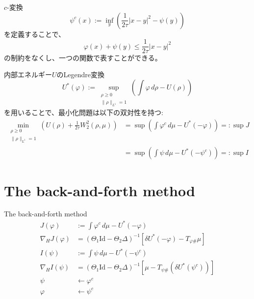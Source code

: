 \documentclass[dvipdfmx, 12pt]{beamer}
\begin{document}
\begin{frame}{}
    \(c\)-変換
    \[
        \psi^c(x) := \inf_{y} \left(\frac{1}{2\tau} |x-y|^2 - \psi(y)\right)
    \]
    を定義することで、
    \[
        \varphi(x) + \psi(y) \leq \frac{1}{2 \tau} |x - y|^2
    \]
    の制約をなくし、一つの関数で表すことができる。

    
\end{frame}


\begin{frame}{}

    内部エネルギー$U$のLegendre変換
    \[
      U^*(\varphi) := \sup_{{\substack{\rho \ge 0 \\ \|\rho\|_{L^1} = 1}}} \left(\int \varphi \, d\rho - U(\rho) \right)
    \]
    \vspace\baselineskip
    を用いることで、最小化問題は以下の双対性を持つ:
    \begin{align*}
        \min_{{\substack{\rho \ge 0 \\ \|\rho\|_{L^1} = 1}}} \left(U(\rho) + \frac{1}{2\tau} W_2^2(\rho, \mu)\right) 
        &= \sup\left(\int \varphi^c \,d\mu - U^*(-\varphi)\right) =: \sup J\\
        &= \sup\left(\int \psi \,d\mu - U^*(-\psi^c)\right) =: \sup I
    \end{align*}    
\end{frame}


\section{The back-and-forth method}
\begin{frame}{The back-and-forth method}
    \begin{align*}
         J(\varphi) &:= \int \varphi^c \,d\mu - U^*(-\varphi)  \\
        \nabla_H J(\varphi) &= (\Theta_1 \text{Id} - \Theta_2 \Delta)^{-1} \left[\delta U^*(- \varphi)-  T_{\varphi \#} \mu \right]\\
        I(\psi)&:= \int \psi \,d\mu - U^*(-\psi^c)\\
        \nabla_H I(\psi) &= (\Theta_1 \text{Id} - \Theta_2 \Delta)^{-1} \left[\mu - T_{\psi \#} (\delta U^*(\psi^c))\right]\\
        \psi &\leftarrow \varphi^c\\
        \varphi &\leftarrow  \psi^c
    \end{align*}
\end{frame}


\begin{comment}
\end{comment}
\end{document}
